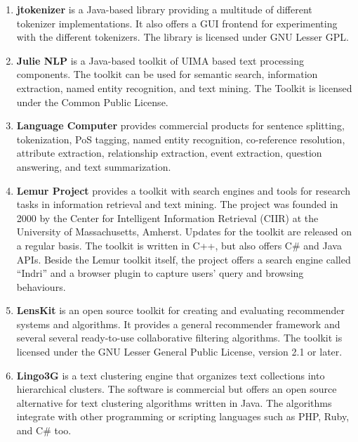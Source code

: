 \begin{enumerate}
	\item \textbf{jtokenizer} \cite{jtokenizer} is a Java-based library providing a multitude of different tokenizer implementations. It also offers a GUI frontend for experimenting with the different tokenizers. The library is licensed under GNU Lesser GPL.

	\item \textbf{Julie NLP} \cite{tomanek2007uima,hahn2008overview} is a Java-based toolkit of UIMA based text processing components. The toolkit can be used for semantic search, information extraction, named entity recognition, and text mining.
The Toolkit is licensed under the Common Public License.

	\item \textbf{Language Computer} \cite{lanuagecomputer} provides commercial products for sentence splitting, tokenization, PoS tagging, named entity recognition, co-reference resolution, attribute extraction, relationship extraction, event extraction, question answering, and text summarization.

	\item \textbf{Lemur Project} \cite{lemur} provides a toolkit with search engines and tools for research tasks in information retrieval and text mining. The project was founded in 2000 by the Center for Intelligent Information Retrieval (CIIR) at the University of Massachusetts, Amherst. Updates for the toolkit are released on a regular basis. The toolkit is written in C++, but also offers C\# and Java APIs. Beside the Lemur toolkit itself, the project offers a search engine called ``Indri'' and a browser plugin to capture users' query and browsing behaviours.

	\item \textbf{LensKit} \cite{lenskit} is an open source toolkit for creating and evaluating recommender systems and algorithms. It provides a general recommender framework and several several ready-to-use collaborative filtering algorithms. The toolkit is licensed under the GNU Lesser General Public License, version 2.1 or later.

	\item \textbf{Lingo3G} \cite{lingo3g} is a text clustering engine that organizes text collections into hierarchical clusters.
The software is commercial but \cite{stefanowski2003carrot} offers an open source alternative for text clustering algorithms written in Java. The algorithms integrate with other programming or scripting languages such as PHP, Ruby, and C\# too.


\end{enumerate}
